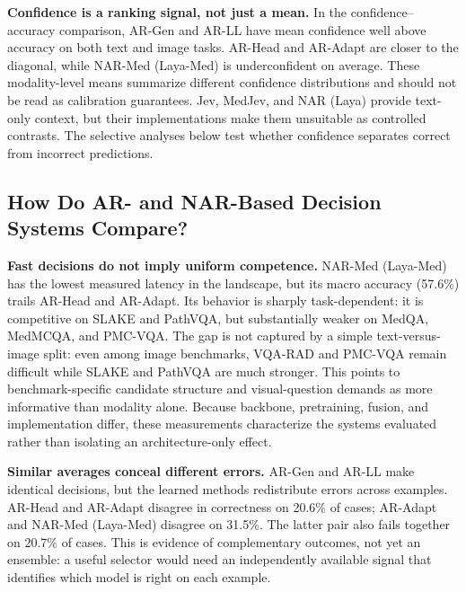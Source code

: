 \textbf{Confidence is a ranking signal, not just a mean.} In the confidence--accuracy comparison, AR-Gen and AR-LL have mean confidence well above accuracy on both text and image tasks. AR-Head and AR-Adapt are closer to the diagonal, while NAR-Med (Laya-Med) is underconfident on average. These modality-level means summarize different confidence distributions and should not be read as calibration guarantees. Jev, MedJev, and NAR (Laya) provide text-only context, but their implementations make them unsuitable as controlled contrasts. The selective analyses below test whether confidence separates correct from incorrect predictions.

\subsection{How Do AR- and NAR-Based Decision Systems Compare?}
\label{sec:rq3}

\textbf{Fast decisions do not imply uniform competence.} NAR-Med (Laya-Med) has the lowest measured latency in the landscape, but its macro accuracy (57.6\%) trails AR-Head and AR-Adapt. Its behavior is sharply task-dependent: it is competitive on SLAKE and PathVQA, but substantially weaker on MedQA, MedMCQA, and PMC-VQA. The gap is not captured by a simple text-versus-image split: even among image benchmarks, VQA-RAD and PMC-VQA remain difficult while SLAKE and PathVQA are much stronger. This points to benchmark-specific candidate structure and visual-question demands as more informative than modality alone. Because backbone, pretraining, fusion, and implementation differ, these measurements characterize the systems evaluated rather than isolating an architecture-only effect.

\textbf{Similar averages conceal different errors.} AR-Gen and AR-LL make identical decisions, but the learned methods redistribute errors across examples. AR-Head and AR-Adapt disagree in correctness on 20.6\% of cases; AR-Adapt and NAR-Med (Laya-Med) disagree on 31.5\%. The latter pair also fails together on 20.7\% of cases. This is evidence of complementary outcomes, not yet an ensemble: a useful selector would need an independently available signal that identifies which model is right on each example.

